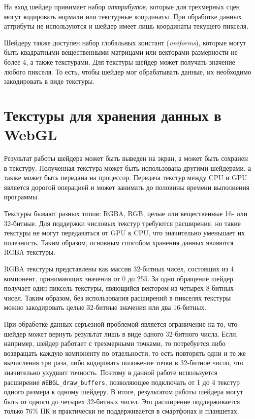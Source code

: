 На вход шейдер принимает набор {\itshape аттрибутов}, которые для трехмерных сцен могут кодировать нормали или текстурные координаты. При обработке данных аттрибуты не используются и шейдер имеет лишь координаты текущего пикселя.

Шейдеру также доступен набор глобальных констант ({\itshape uniforms}), которые могут быть квадратными вещественными матрицами или векторами размерности не более 4, а также текстурами. Для текстуры шейдер может получать значение любого пикселя. То есть, чтобы шейдер мог обрабатывать данные, их необходимо закодировать в виде текстуры.

\section{Текстуры для хранения данных в WebGL}

Результат работы шейдера может быть выведен на экран, а может быть сохранен в текстуру. Полученная текстура может быть использована другими шейдерами, а также может быть передана на процессор. Передача текстур между CPU и GPU является дорогой операцией и может занимать до половины времени выполнения программы.

Текстуры бывают разных типов: RGBA, RGB, целые или вещественные 16- или 32-битные. Для поддержки числовых текстур требуются расширения, но такие текстуры не могут передаваться от GPU к CPU, что значительно уменьшает их полезность. Таким образом, основным способом хранения данных являются RGBA текстуры.

RGBA текстуры представлены как массив 32-битных чисел, состоящих из 4 компонент, принимающих значения от 0 до 255. За одно обращение шейдер получает один пиксель текстуры, явяющийся вектором из четырех 8-битных чисел. Таким образом, без использования расширений в пикселях текстуры можно закодировать целые 32-битные значения или два 16-битных.

При обработке данных серъезной проблемой является ограничение на то, что шейдер может вернуть результат лишь в виде одного 32-битного числа. Если, например, шейдер работает с трехмерными точками, то потребуется либо возвращать каждую компоненту по отдельности, то есть повторять одни и те же вычисления три раза, либо кодировать положение точки в 32-битное число, что значительно ухудшит точность. Поэтому в данной работе используется расширение \texttt{WEBGL\_draw\_buffers}, позволяющее подключать от 1 до 4 текстур одного размера к одному шейдеру. В итоге, результатом работы шейдера могут быть от одного до четырех 32-битных чисел. Это расширение поддерживается только 76\% ПК и практически не поддерживается в смартфонах и планшетах.

